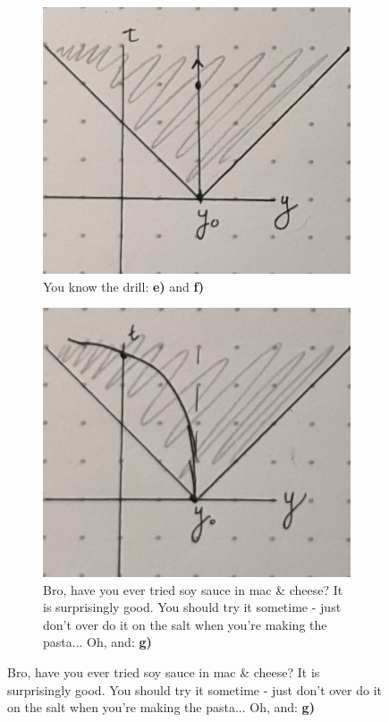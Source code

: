 \documentclass[12pt]{article}
\begin{document}
\begin{enumerate}[label=\alph*)]
\begin{figure}[!ht]
\centering
	\begin{subfigure}{0.45\textwidth}
	\includegraphics[width=\textwidth]{gr_1.3.jpg}
	\caption{You know the drill: {\bf e)} and {\bf f)}}
	\label{fig:1.3}
	\end{subfigure}
	\hfill
	\begin{subfigure}{0.45\textwidth}
	\includegraphics[width=\textwidth]{gr_1.4.jpg}
	\caption{Bro, have you ever tried soy sauce in mac \& cheese? It is surprisingly good. You should try it sometime - just don't over do it on the salt when you're making the pasta... Oh, and: {\bf g)}}
	\label{fig:1.4}
	\end{subfigure}
\end{figure}


\end{enumerate}
\end{document}

